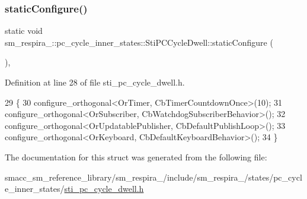 \subsubsection{\texorpdfstring{static\+Configure()}{staticConfigure()}}
{\footnotesize\ttfamily static void sm\+\_\+respira\+\_\+::pc\+\_\+cycle\+\_\+inner\+\_\+states\+::\+Sti\+P\+C\+Cycle\+Dwell\+::static\+Configure (\begin{DoxyParamCaption}{ }\end{DoxyParamCaption})\hspace{0.3cm}{\ttfamily [inline]}, {\ttfamily [static]}}



Definition at line 28 of file sti\+\_\+pc\+\_\+cycle\+\_\+dwell.\+h.


\begin{DoxyCode}
29   \{
30     configure\_orthogonal<OrTimer, CbTimerCountdownOnce>(10);
31     configure\_orthogonal<OrSubscriber, CbWatchdogSubscriberBehavior>();
32     configure\_orthogonal<OrUpdatablePublisher, CbDefaultPublishLoop>();
33     configure\_orthogonal<OrKeyboard, CbDefaultKeyboardBehavior>();
34   \}
\end{DoxyCode}


The documentation for this struct was generated from the following file\+:\begin{DoxyCompactItemize}
\item 
smacc\+\_\+sm\+\_\+reference\+\_\+library/sm\+\_\+respira\+\_/include/sm\+\_\+respira\+\_/states/pc\+\_\+cycle\+\_\+inner\+\_\+states/\hyperlink{sti__pc__cycle__dwell_8h}{sti\+\_\+pc\+\_\+cycle\+\_\+dwell.\+h}\end{DoxyCompactItemize}
